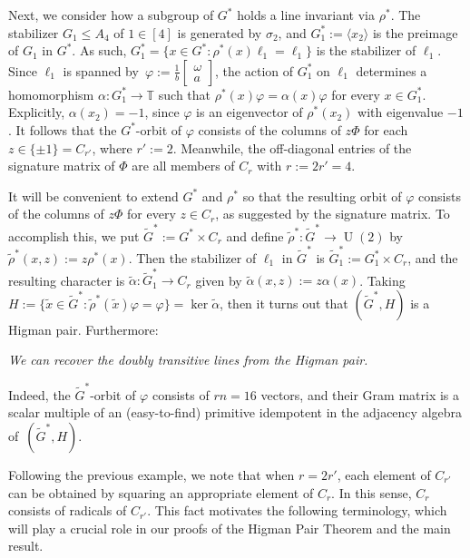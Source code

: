 \begin{example}
Next, we consider how a subgroup of $G^*$ holds a line invariant via $\rho^*$.
The stabilizer $G_1 \leq A_4$ of $1\in[4]$ is generated by $\sigma_2$, and $G_1^*:=\langle x_2\rangle$ is the preimage of $G_1$ in $G^*$.
As such, $G_1^*={\{x\in G^*:}\rho^*(x)\ell_1=\ell_1\}$ is the stabilizer of $\ell_1$.
Since $\ell_1$ is spanned by~$\varphi:=\frac{1}{b}\left[\begin{smallmatrix}\omega\\a\end{smallmatrix}\right]$, the action of $G_1^*$ on $\ell_1$ determines a homomorphism $\alpha\colon G_1^*\to\mathbb{T}$ such that $\rho^*(x)\varphi=\alpha(x)\varphi$ for every $x\in G_1^*$.
Explicitly, $\alpha(x_2)=-1$, since $\varphi$ is an eigenvector of $\rho^*(x_2)$ with eigenvalue $-1$.
It follows that the $G^*$-orbit of $\varphi$ consists of the columns of $z\Phi$ for each $z\in\{\pm1\}=C_{r'}$, where $r':=2$.
Meanwhile, the off-diagonal entries of the signature matrix of $\Phi$ are all members of $C_r$ with $r:=2r'=4$.

It will be convenient to extend $G^*$ and $\rho^*$ so that the resulting orbit of $\varphi$ consists of the columns of $z\Phi$ for every $z\in C_r$, as suggested by the signature matrix.
To accomplish this, we put $\tilde{G}^*:=G^*\times C_r$ and define $\tilde{\rho}^*\colon \tilde{G}^*\to\operatorname{U}(2)$ by $\tilde{\rho}^*(x,z):=z\rho^*(x)$.
Then the stabilizer of $\ell_1$ in $\tilde{G}^*$ is $\tilde{G}^*_1:=G^*_1\times C_r$, and the resulting character is $\tilde{\alpha}\colon\tilde{G}^*_1\to C_r$ given by $\tilde{\alpha}(x,z):=z\alpha(x)$.
Taking $H:=\{\tilde{x}\in\tilde{G}^*:\tilde{\rho}^*(\tilde{x})\varphi=\varphi\}=\operatorname{ker}\tilde{\alpha}$, then it turns out that $(\tilde{G}^*,H)$ is a Higman pair.
Furthermore:
\begin{center}
\textit{We can recover the doubly transitive lines from the Higman pair.}
\end{center}
Indeed, the $\tilde{G}^*$-orbit of $\varphi$ consists of $rn=16$ vectors, and their Gram matrix is a scalar multiple of an (easy-to-find) primitive idempotent in the adjacency algebra of~$(\tilde{G}^*,H)$.
\end{example}

Following the previous example, we note that when $r = 2r'$, each element of $C_{r'}$ can be obtained by squaring an appropriate element of $C_r$.
In this sense, $C_r$ consists of radicals of $C_{r'}$.
This fact motivates the following terminology, which will play a crucial role in our proofs of the Higman Pair Theorem and the main result.


